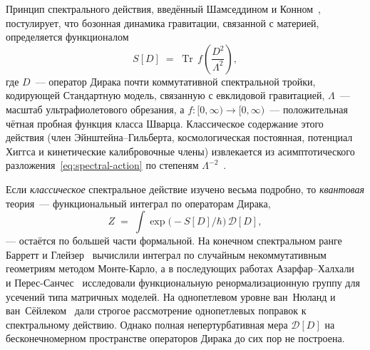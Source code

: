 \documentclass[12pt,a4paper]{article}
\theoremstyle{plain}
\theoremstyle{definition}
\theoremstyle{remark}
\newcommand{\Tr}{\operatorname{Tr}}
\newcommand{\Lam}{\Lambda}
\begin{document}
Принцип спектрального действия, введённый Шамседдином и
Конном~\cite{CC:1996,CC:1997}, постулирует, что бозонная динамика
гравитации, связанной с материей, определяется функционалом
\begin{equation}\label{eq:spectral-action}
  S[D] \;=\; \Tr\, f\!\left(\frac{D^2}{\Lam^2}\right),
\end{equation}
где $D$~--- оператор Дирака почти коммутативной спектральной тройки,
кодирующей Стандартную модель, связанную с евклидовой гравитацией,
$\Lam$~--- масштаб ультрафиолетового обрезания, а
$f\colon [0,\infty)\to [0,\infty)$~--- положительная чётная
пробная функция класса Шварца.  Классическое содержание этого
действия (член Эйнштейна--Гильберта, космологическая постоянная,
потенциал Хиггса и кинетические калибровочные члены) извлекается
из асимптотического разложения~\eqref{eq:spectral-action} по степеням
$\Lam^{-2}$~\cite{CC:1997,CCM:2007,vS:2015}.

Если \emph{классическое} спектральное действие изучено весьма
подробно, то \emph{квантовая} теория~--- функциональный интеграл
по операторам Дирака,
\begin{equation}\label{eq:naive-PI}
  Z \;=\; \int \exp\!\bigl(-S[D]/\hbar\bigr)\,\mathcal{D}[D],
\end{equation}
--- остаётся по большей части формальной.  На конечном спектральном
ранге Барретт и Глейзер~\cite{BarrettGlaser:2016} вычислили интеграл по
случайным некоммутативным геометриям методом Монте-Карло, а в
последующих работах Азарфар--Халхали~\cite{AzarfarKhalkhali:2024} и
Перес-Санчес~\cite{PerezSanchez:2021} исследовали функциональную
ренормализационную группу для усечений типа матричных моделей.  На
однопетлевом уровне ван~Нюланд и ван~Сёйлеком~\cite{vNvS:2022} дали
строгое рассмотрение однопетлевых поправок к спектральному действию.
Однако полная непертурбативная мера $\mathcal{D}[D]$ на
бесконечномерном пространстве операторов Дирака до сих пор не
построена.
\end{document}
